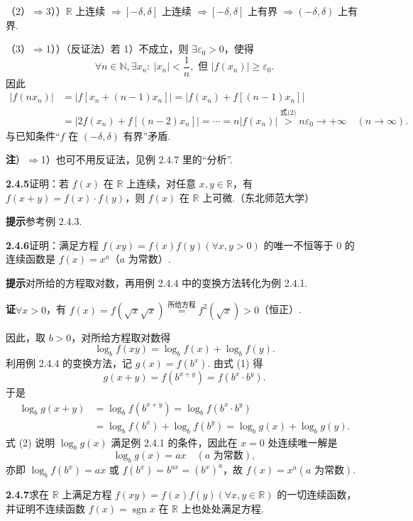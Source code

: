 \documentclass[UTF8,12pt,a4paper,fontset=fandol]{ctexart}
\begin{document}
（2）$\Rightarrow$3））$\mathbb{R}$ 上连续 $\Rightarrow[-\delta,\delta]$ 上连续 $\Rightarrow[-\delta,\delta]$ 上有界 $\Rightarrow(-\delta,\delta)$ 上有界.

（3）$\Rightarrow$1））（反证法）若 1）不成立，则 $\exists\varepsilon_0>0$，使得
\[
  \forall n\in\mathbb{N},\exists x_n:\ |x_n|<\frac1n,\text{ 但 }|f(x_n)|\ge\varepsilon_0. \tag{2}
\]
因此
\[
\begin{aligned}
|f(nx_n)|
&=|f[x_n+(n-1)x_n]|=|f(x_n)+f[(n-1)x_n]|\\
&=|2f(x_n)+f[(n-2)x_n]|=\cdots=n|f(x_n)|\overset{\text{式(2)}}{>}n\varepsilon_0\to+\infty\quad(n\to\infty).
\end{aligned}
\]
与已知条件“$f$ 在 $(-\delta,\delta)$ 有界”矛盾.

\noindent\textbf{注}）$\Rightarrow$1）也可不用反证法，见例 2.4.7 里的“分析”.

\noindent\textbf{2.4.5}\quad 证明：若 $f(x)$ 在 $\mathbb{R}$ 上连续，对任意 $x,y\in\mathbb{R}$，有 $f(x+y)=f(x)\cdot f(y)$，则 $f(x)$ 在 $\mathbb{R}$ 上可微.（东北师范大学）

\noindent\textbf{提示}\quad 参考例 2.4.3.

\noindent\textbf{2.4.6}\quad 证明：满足方程 $f(xy)=f(x)f(y)(\forall x,y>0)$ 的唯一不恒等于 0 的连续函数是 $f(x)=x^a$（$a$ 为常数）.

\noindent\textbf{提示}\quad 对所给的方程取对数，再用例 2.4.4 中的变换方法转化为例 2.4.1.

\noindent\textbf{证}\quad $\forall x>0$，有 $f(x)=f(\sqrt{x}\sqrt{x})\overset{\text{所给方程}}{=}f^2(\sqrt{x})>0$（恒正）.

因此，取 $b>0$，对所给方程取对数得
\[
  \log_b f(xy)=\log_b f(x)+\log_b f(y). \tag{1}
\]
利用例 2.4.4 的变换方法，记 $g(x)=f(b^x)$. 由式 (1) 得
\[
  g(x+y)=f(b^{x+y})=f(b^x\cdot b^y).
\]
于是
\[
\begin{aligned}
\log_b g(x+y)
&=\log_b f(b^{x+y})=\log_b f(b^x\cdot b^y)\\
&=\log_b f(b^x)+\log_b f(b^y)=\log_b g(x)+\log_b g(y).
\end{aligned} \tag{2}
\]
式 (2) 说明 $\log_b g(x)$ 满足例 2.4.1 的条件，因此在 $x=0$ 处连续唯一解是
\[
  \log_b g(x)=ax\quad(a\text{ 为常数}),
\]
亦即 $\log_b f(b^x)=ax$ 或 $f(b^x)=b^{ax}=(b^x)^a$，故 $f(x)=x^a(a\text{ 为常数})$.

\noindent\textbf{2.4.7}\quad 求在 $\mathbb{R}$ 上满足方程 $f(xy)=f(x)f(y)(\forall x,y\in\mathbb{R})$ 的一切连续函数，并证明不连续函数 $f(x)=\operatorname{sgn} x$ 在 $\mathbb{R}$ 上也处处满足方程.
\end{document}
